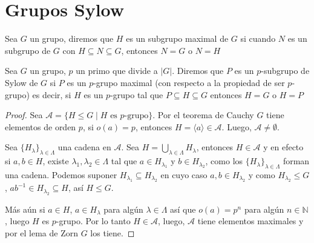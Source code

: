 \section{Grupos Sylow}
\label{sec: Grupos Sylow}

\begin{defi}
    Sea $G$ un grupo, diremos que $H$ es un subgrupo maximal de $G$ si cuando $N$ es un subgrupo de $G$ con $H \subseteq N \subseteq G$, entonces $N=G$ o $N=H$
\end{defi}

\begin{defi}
    Sea $G$ un grupo, $p$ un primo que divide a $|G|$. Diremos que $P$ es un $p$-subgrupo de Sylow de $G$ si $P$ es un $p$-grupo maximal (con respecto a la propiedad de ser $p$-grupo) es decir, si $H$ es un $p$-grupo tal que $P \subseteq H \subseteq G$ entonces $H=G$ o $H=P$
\end{defi}


\begin{proof}
    Sea $\mathcal{A} = \{ H \le G \mid H \text{ es } p\text{-grupo} \}$. Por el teorema de Cauchy $G$ tiene elementos de orden $p$, si $o(a)=p$, entonces $H=\langle a \rangle \in \mathcal{A}$. Luego, $\mathcal{A} \neq \emptyset$.
    
    Sea $\{H_\lambda\}_{\lambda \in \Lambda}$ una cadena en $\mathcal{A}$. Sea $H = \bigcup_{\lambda \in \Lambda} H_\lambda$, entonces $H \in \mathcal{A}$ y en efecto si $a, b \in H$, existe $\lambda_1, \lambda_2 \in \Lambda$ tal que $a \in H_{\lambda_1}$ y $b \in H_{\lambda_2}$, como los $\{H_\lambda\}_{\lambda \in \Lambda}$ forman una cadena. Podemos suponer $H_{\lambda_1} \subseteq H_{\lambda_2}$ en cuyo caso $a, b \in H_{\lambda_2}$ y como $H_{\lambda_2} \le G$, $ab^{-1} \in H_{\lambda_2} \subseteq H$, así $H \le G$.
    
    Más aún si $a \in H$, $a \in H_\lambda$ para algún $\lambda \in \Lambda$ así que $o(a)=p^n$ para algún $n \in \mathbb{N}$, luego $H$ es $p$-grupo. Por lo tanto $H \in \mathcal{A}$, luego, $\mathcal{A}$ tiene elementos maximales y por el lema de Zorn $G$ los tiene.
\end{proof}


